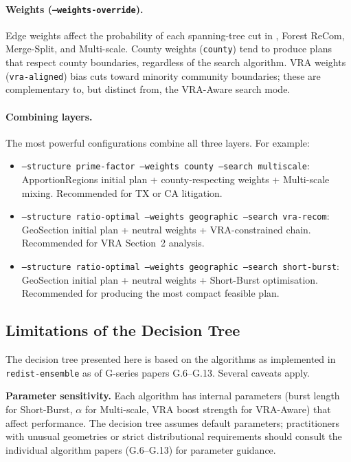 \paragraph{Weights (\texttt{--weights-override}).}
Edge weights affect the probability of each spanning-tree cut in \recom{},
Forest ReCom, Merge-Split, and Multi-scale.
County weights (\texttt{county}) tend to produce plans that respect county
boundaries, regardless of the search algorithm.
VRA weights (\texttt{vra-aligned}) bias cuts toward minority community
boundaries; these are complementary to, but distinct from, the VRA-Aware
search mode.

\paragraph{Combining layers.}
The most powerful configurations combine all three layers.
For example:
\begin{itemize}
  \item \texttt{--structure prime-factor --weights county --search multiscale}:
        ApportionRegions initial plan + county-respecting weights +
        Multi-scale mixing.
        Recommended for TX or CA litigation.
  \item \texttt{--structure ratio-optimal --weights geographic --search vra-recom}:
        GeoSection initial plan + neutral weights + VRA-constrained chain.
        Recommended for VRA Section~2 analysis.
  \item \texttt{--structure ratio-optimal --weights geographic --search short-burst}:
        GeoSection initial plan + neutral weights + Short-Burst optimisation.
        Recommended for producing the most compact feasible plan.
\end{itemize}

\subsection{Limitations of the Decision Tree}

The decision tree presented here is based on the algorithms as implemented
in \texttt{redist-ensemble} as of G-series papers G.6--G.13.
Several caveats apply.

\textbf{Parameter sensitivity.}
Each algorithm has internal parameters (burst length for Short-Burst,
$\alpha$ for Multi-scale, VRA boost strength for VRA-Aware) that affect
performance.
The decision tree assumes default parameters; practitioners with unusual
geometries or strict distributional requirements should consult the
individual algorithm papers (G.6--G.13) for parameter guidance.

